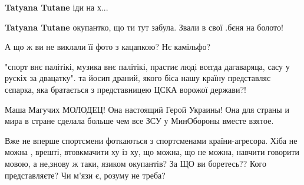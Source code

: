 \begin{itemize}
\begin{itemize}
\begin{itemize}
\textbf{Tatyana Tutane} іди на х...

 
\textbf{Tatyana Tutane} окупантко, що ти тут забула. Звали в свої .бєня на болото!
\end{itemize}

\end{itemize}

 

А що ж ви не виклали її фото з кацапкою? Нє камільфо?

"спорт внє палітікі, музика внє палітікі, прастиє люді всєгда дагаваряца, сасу
у рускіх за двацатку". та йосип драний, якого біса нашу країну представляє
сєпарка, яка братається з представницею ЦСКА ворожої держави?!


 
Маша Магучих МОЛОДЕЦ! Она настоящий Герой Украины! Она для страны и мира в
стране сделала больше чем все ЗСУ у МинОбороны вместе взятое.


 

Вже не вперше спортсмени фоткаються з спортсменами країни-агресора. Хіба не
можна , врешті, втовкмачити ху із ху, що можна, що не можна, навчити говорити
мовою, а не,знову ж таки, язиком окупантів? За ЩО ви боретесь?? Кого
представляєте? Чи м'язи є, розуму не треба?

 

\end{itemize}
